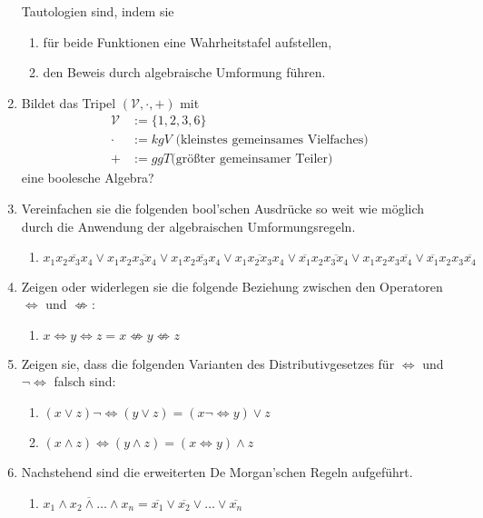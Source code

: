 \documentclass[paper=a4,fontsize=11pt]{scrartcl}%
\numberwithin{equation}{section}
\begin{document}
\begin{enumerate}
	Tautologien sind, indem sie
	\begin{enumerate}
		\item für beide Funktionen eine Wahrheitstafel aufstellen,
		\item den Beweis durch algebraische Umformung führen.
	\end{enumerate}
	\item Bildet das Tripel $( \mathcal{V}, \cdot, +)$ mit
	\begin{align*}
		\mathcal{V} & := \{1,2,3,6\}\\
		\cdot 		& := kgV \text{ (kleinstes gemeinsames Vielfaches)}\\
		+ 			& := ggT \text{(größter gemeinsamer Teiler)}
	\end{align*}	
	eine boolesche Algebra?
	\item Vereinfachen sie die folgenden bool'schen Ausdrücke so weit wie möglich durch die Anwendung der algebraischen Umformungsregeln.
	\begin{enumerate}
		\item $ x_1 \overline{x_2 x_3 x_4} \lor x_1 x_2 \overline{x_3 x_4} \lor x_1 x_2 \overline{x_3} x_4 \lor x_1 \overline{x_2 x_3} x_4 \lor \overline{x_1} x_2 \overline{x_3 x_4} \lor x_1 x_2 x_3 \overline{x_4} \lor \overline{x_1} x_2 x_3 \overline{x_4}$
	\end{enumerate}
	\item Zeigen oder widerlegen sie die folgende Beziehung zwischen den Operatoren $\Leftrightarrow$ und $\not\Leftrightarrow$:
	\begin{enumerate}
		\item $x \Leftrightarrow y \Leftrightarrow z = x \not\Leftrightarrow y \not\Leftrightarrow z$
	\end{enumerate}
	\item Zeigen sie, dass die folgenden Varianten des Distributivgesetzes für $\Leftrightarrow$ und $\neg \Leftrightarrow$ falsch sind:
	\begin{enumerate}[resume]
		\item $(x \lor z) \neg \Leftrightarrow (y \lor z) = (x \neg \Leftrightarrow y) \lor z$
		\item $(x \land z) \Leftrightarrow (y \land z) = (x \Leftrightarrow y) \land z$
	\end{enumerate}
	\item Nachstehend sind die erweiterten De Morgan'schen Regeln aufgeführt.
	\begin{enumerate}
		\item $\overline{x_1 \land x_2 \land \ldots \land x_n} = \overline{x_1} \lor \overline{x_2} \lor \ldots \lor \overline{x_n}$

\end{enumerate}
\end{enumerate}
\end{document}
